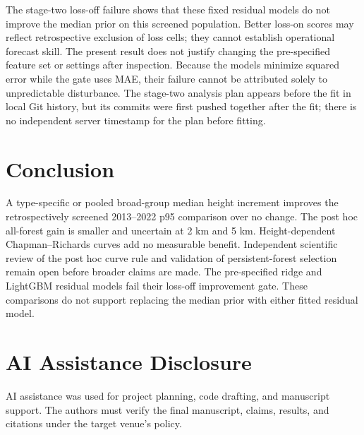 \documentclass[11pt]{article}
\begin{document}
The stage-two loss-off failure shows that these fixed residual models
do not improve the median prior on this screened population. Better
loss-on scores may reflect retrospective exclusion of loss cells;
they cannot establish operational forecast skill. The present result
does not justify changing the pre-specified feature set or settings
after inspection. Because the models minimize squared error while the
gate uses MAE, their failure cannot be attributed solely to
unpredictable disturbance.
The stage-two analysis plan appears before the fit in local Git
history, but its commits were first pushed together after the fit;
there is no independent server timestamp for the plan before fitting.

\section{Conclusion}
A type-specific or pooled broad-group median height increment improves
the retrospectively screened 2013--2022 p95 comparison over no change.
The post hoc all-forest gain is smaller and uncertain at 2 km and 5 km.
Height-dependent Chapman--Richards curves add no measurable benefit.
Independent scientific
review of the post hoc curve rule and validation of persistent-forest
selection remain open before broader claims are made.
The pre-specified ridge and LightGBM residual models fail their
loss-off improvement gate. These comparisons do not support replacing
the median prior with either fitted residual model.

\section*{AI Assistance Disclosure}
AI assistance was used for project planning, code drafting, and manuscript
support. The authors must verify the final manuscript, claims, results,
and citations under the target venue's policy.
\end{document}
